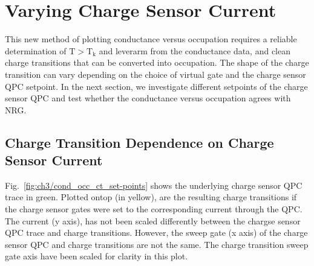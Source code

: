 \section{Varying Charge Sensor Current}

This new method of plotting conductance versus occupation requires a reliable determination of $\mathrm{T>T_k}$ and leverarm from the conductance data, and clean charge transitions that can be converted into occupation. The shape of the charge transition can vary depending on the choice of virtual gate and the charge sensor QPC setpoint. In the next section, we investigate different setpoints of the charge sensor QPC and test whether the conductance versus occupation agrees with NRG.

\subsection{Charge Transition Dependence on Charge Sensor Current}

Fig.~\ref{fig:ch3/cond_occ_ct_set-points} shows the underlying charge sensor QPC trace in green. Plotted ontop (in yellow), are the resulting charge transitions if the charge sensor gates were set to the corresponding current through the QPC. The current (y axis), has not been scaled differently between the chargse sensor QPC trace and charge transitions. However, the sweep gate (x axis) of the charge sensor QPC and charge transitions are not the same. The charge transition sweep gate axis have been scaled for clarity in this plot. 


